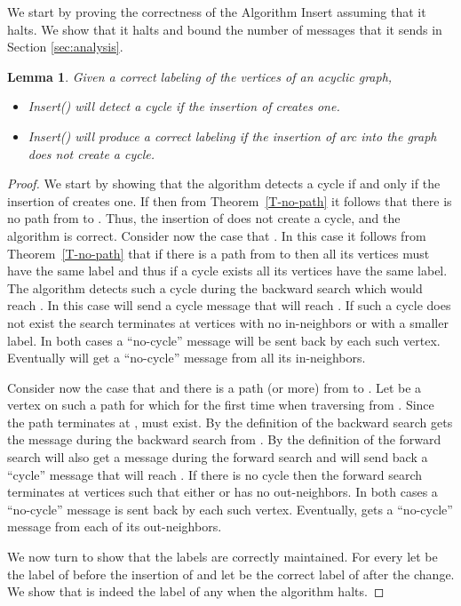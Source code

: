 \documentclass[11pt]{article}
\theoremstyle{plain}
\newtheorem{lem}[thm]{Lemma}
\theoremstyle{definition}
\theoremstyle{remark}
\numberwithin{equation}{section}
\begin{document}
We start by proving the correctness of the  Algorithm Insert
assuming that it halts. We show that it halts and  bound the number
of messages that it sends in Section \ref{sec:analysis}.

\begin{lem}
Given a correct labeling of the vertices of an acyclic graph,
\begin{itemize}
  \item Insert() will detect a cycle if the insertion of  creates one.
  \item Insert() will produce a correct labeling if the insertion of arc  into the graph does not create a cycle.
\end{itemize}
\end{lem}
\begin{proof}

We start by showing that the algorithm detects a cycle if and only
if the insertion of  creates one. If 
then from Theorem~\ref{T-no-path} it follows that there is no path
from  to . Thus, the insertion of  does not create a
cycle, and the algorithm is correct. Consider now the case that
. In this case it follows from
Theorem~\ref{T-no-path} that if there is a path from  to  then
all its vertices must have the same label and thus if a cycle exists
all its vertices have the same label. The algorithm detects such a
cycle during the backward search which would reach . In this case
 will send a cycle message that will reach . If such a cycle
does not exist the search terminates at vertices with no
in-neighbors or with a smaller label. In both cases a ``no-cycle''
message will be sent back by each such vertex. Eventually  will
get a ``no-cycle'' message from all its in-neighbors.

Consider now the case that  and there is a
path (or more) from  to . Let  be a vertex on such a path
 for which  for the first time when traversing
 from . Since the path terminates at ,   must exist. By
the definition of the backward search   gets the message
 during the backward search from .  By the
definition of the forward search   will also get a message
   during the forward search and will send back a ``cycle'' message that will reach .
  If there is
no cycle then the forward search terminates at vertices  such
that either  or  has no out-neighbors. In
both cases a ``no-cycle'' message is sent back by each such vertex.
Eventually,  gets  a ``no-cycle'' message from each of its
out-neighbors.

We now turn to show that the labels are correctly maintained. For
every  let  be the label of   before the
insertion of  and let  be the correct label of
 after the change. We show that  is indeed the
label of any  when the algorithm halts.


\end{proof}
\end{document}
